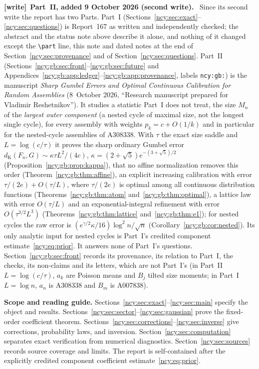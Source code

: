 \documentclass[11pt,letterpaper]{article}
\numberwithin{equation}{section}
\theoremstyle{remark}\newtheorem{remark}[theorem]{Remark}
\newcommand{\file}[1]{\nolinkurl{#1}}
\newenvironment{writenote}[1][]{\par\smallskip\begingroup\small
 \noindent\textbf{[write]}\if\relax\detokenize{#1}\relax\else~\textbf{#1.}\fi\ }%
 {\par\endgroup\smallskip}
\theoremstyle{definition}\newtheorem{definition}[theorem]{Definition}\theoremstyle{plain}
\newcommand{\DK}{d_{\mathrm K}}
\begin{document}
\begin{writenote}[Part~II, added 9 October 2026 (second write)]
Since its second write the report has two Parts. Part~I
(Sections~\ref{ncy:sec:exact}--\ref{ncy:sec:questions}) is Report~167 as
written and independently checked; the abstract and the status note above
describe it alone, and nothing of it changed except the \verb|\part| line,
this note and dated notes at the end of Section~\ref{ncy:sec:provenance} and
of Section~\ref{ncy:sec:questions}. Part~II
(Sections~\ref{ncy:gb:sec:front}--\ref{ncy:gb:sec:future} and
Appendices~\ref{ncy:gb:app:ledger}--\ref{ncy:gb:app:provenance}, labels
\file{ncy:gb:}) is the manuscript \emph{Sharp Gumbel Errors and Optimal
Continuous Calibration for Random Assemblies} (8~October 2026, ``Research
manuscript prepared for Vladimir Reshetnikov''). It studies a statistic
Part~I does not treat, the size $M_n$ of the \emph{largest outer component}
(a nested cycle of maximal size, not the longest single cycle), for every
assembly with weights $p_k=c+O(1/k)$ and in particular for the nested-cycle
assemblies of A308338. With $\tau$ the exact size saddle and
$L=\log(c/\tau)$ it proves the sharp ordinary Gumbel error
$\DK(F_n,G)\sim\kappa\tau L^2/(4c)$, $\kappa=(2+\sqrt5)e^{-(3+\sqrt5)/2}$
(Proposition~\ref{ncy:gb:prop:kappa}), that no affine normalization removes
this order (Theorem~\ref{ncy:gb:thm:affine}), an explicit increasing
calibration with error $\tau/(2e)+O(\tau/L)$, where $\tau/(2e)$ is optimal
among all continuous distribution functions
(Theorems~\ref{ncy:gb:thm:atom} and~\ref{ncy:gb:thm:optimal}), a lattice
law with error $O(\tau/L)$ and an exponential-integral refinement with error
$O(\tau^{3/2}L^3)$ (Theorems~\ref{ncy:gb:thm:lattice}
and~\ref{ncy:gb:thm:e1}); for nested cycles the raw error is
$(e^{\gamma/2}\kappa/16)\log^2n/\sqrt n$
(Corollary~\ref{ncy:gb:cor:nested}). Its only analytic input for nested
cycles is Part~I's credited component estimate~\eqref{ncy:eq:prior}. It
answers none of Part~I's questions. Section~\ref{ncy:gb:sec:front} records
its provenance, its relation to Part~I, the checks, its non-claims and its
letters, which are not Part~I's (in Part~II $L=\log(c/\tau)$, $a_k$ are
Poisson means and $B_j$ tilted size moments; in Part~I $L=\log n$, $a_n$ is
A308338 and $B_m$ is A007838).
\end{writenote}
\newpage
\tableofcontents
\medskip
\noindent\textbf{Scope and reading guide.}
Sections~\ref{ncy:sec:exact}--\ref{ncy:sec:main} specify the object and results.
Sections~\ref{ncy:sec:sector}--\ref{ncy:sec:gaussian} prove the fixed-order
coefficient theorem. Sections~\ref{ncy:sec:corrections}--\ref{ncy:sec:inverse}
give corrections, probability laws, and inversion.
Section~\ref{ncy:sec:computation} separates exact verification from numerical
diagnostics. Section~\ref{ncy:sec:sources} records source coverage and
limits. The report is self-contained after the explicitly credited
component coefficient estimate~\eqref{ncy:eq:prior}.
\newpage
\end{document}
